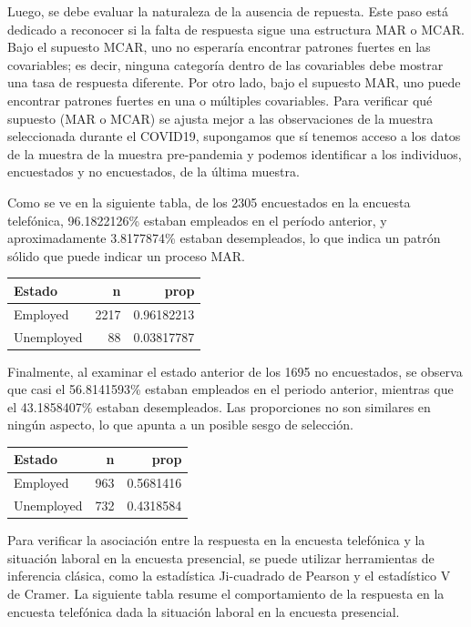 \documentclass[
  12pt,
]{book}
\begin{document}
Luego, se debe evaluar la naturaleza de la ausencia de repuesta. Este paso está dedicado a reconocer si la falta de respuesta sigue una estructura MAR o MCAR. Bajo el supuesto MCAR, uno no esperaría encontrar patrones fuertes en las covariables; es decir, ninguna categoría dentro de las covariables debe mostrar una tasa de respuesta diferente. Por otro lado, bajo el supuesto MAR, uno puede encontrar patrones fuertes en una o múltiples covariables. Para verificar qué supuesto (MAR o MCAR) se ajusta mejor a las observaciones de la muestra seleccionada durante el COVID19, supongamos que sí tenemos acceso a los datos de la muestra de la muestra pre-pandemia y podemos identificar a los individuos, encuestados y no encuestados, de la última muestra.

Como se ve en la siguiente tabla, de los 2305 encuestados en la encuesta telefónica, 96.1822126\% estaban empleados en el período anterior, y aproximadamente 3.8177874\% estaban desempleados, lo que indica un patrón sólido que puede indicar un proceso MAR.

\begin{longtable}{lrr}
\toprule
Estado & n & prop \\ 
\midrule
Employed & 2217 & 0.96182213 \\ 
Unemployed & 88 & 0.03817787 \\ 
\bottomrule
\end{longtable}

Finalmente, al examinar el estado anterior de los 1695 no encuestados, se observa que casi el 56.8141593\% estaban empleados en el periodo anterior, mientras que el 43.1858407\% estaban desempleados. Las proporciones no son similares en ningún aspecto, lo que apunta a un posible sesgo de selección.

\begin{longtable}{lrr}
\toprule
Estado & n & prop \\ 
\midrule
Employed & 963 & 0.5681416 \\ 
Unemployed & 732 & 0.4318584 \\ 
\bottomrule
\end{longtable}

Para verificar la asociación entre la respuesta en la encuesta telefónica y la situación laboral en la encuesta presencial, se puede utilizar herramientas de inferencia clásica, como la estadística Ji-cuadrado de Pearson y el estadístico V de Cramer. La siguiente tabla resume el comportamiento de la respuesta en la encuesta telefónica dada la situación laboral en la encuesta presencial.
\end{document}
